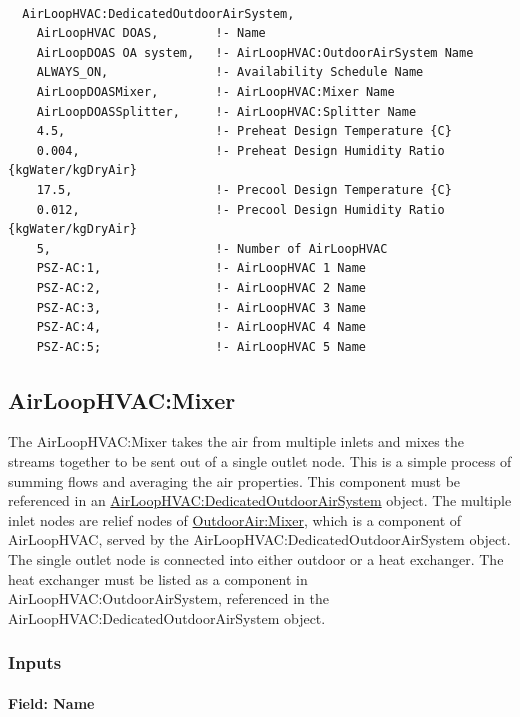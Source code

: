 \begin{lstlisting}

  AirLoopHVAC:DedicatedOutdoorAirSystem,
    AirLoopHVAC DOAS,        !- Name
    AirLoopDOAS OA system,   !- AirLoopHVAC:OutdoorAirSystem Name
    ALWAYS_ON,               !- Availability Schedule Name
    AirLoopDOASMixer,        !- AirLoopHVAC:Mixer Name
    AirLoopDOASSplitter,     !- AirLoopHVAC:Splitter Name
    4.5,                     !- Preheat Design Temperature {C}
    0.004,                   !- Preheat Design Humidity Ratio {kgWater/kgDryAir}
    17.5,                    !- Precool Design Temperature {C}
    0.012,                   !- Precool Design Humidity Ratio {kgWater/kgDryAir}
    5,                       !- Number of AirLoopHVAC
    PSZ-AC:1,                !- AirLoopHVAC 1 Name
    PSZ-AC:2,                !- AirLoopHVAC 2 Name
    PSZ-AC:3,                !- AirLoopHVAC 3 Name
    PSZ-AC:4,                !- AirLoopHVAC 4 Name
    PSZ-AC:5;                !- AirLoopHVAC 5 Name
\end{lstlisting}

\subsection{AirLoopHVAC:Mixer}\label{airloophvacmixer}

The AirLoopHVAC:Mixer takes the air from multiple inlets and mixes the streams together to be sent out of a single outlet node. This is a simple process of summing flows and averaging the air properties. This component must be referenced in an \hyperref[airloophvacdedicatedoutdoorairsystem]{AirLoopHVAC:DedicatedOutdoorAirSystem} object. The multiple inlet nodes are relief nodes of \hyperref[outdoorairmixer]{OutdoorAir:Mixer}, which is a component of AirLoopHVAC, served by the AirLoopHVAC:DedicatedOutdoorAirSystem object. The single outlet node is connected into either outdoor or a heat exchanger. The heat exchanger must be listed as a component in AirLoopHVAC:OutdoorAirSystem, referenced in the AirLoopHVAC:DedicatedOutdoorAirSystem object. 

\subsubsection{Inputs}\label{inputs-5-002}

\paragraph{Field: Name}\label{field-name-5-002}

